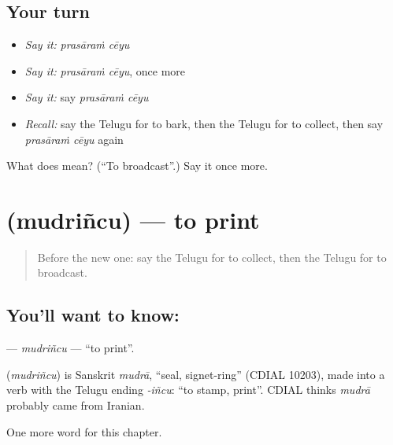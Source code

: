 \subsection*{Your turn}
\begin{itemize}
\raggedright
  \item \emph{Say it:} \emph{prasāraṁ cēyu}
  \item \emph{Say it:} \emph{prasāraṁ cēyu}, once more
  \item \emph{Say it:} say \emph{prasāraṁ cēyu}
  \item \emph{Recall:} say the Telugu for to bark, then the Telugu for to collect, then say \emph{prasāraṁ cēyu} again
\end{itemize}

\begin{tcolorbox}[breakable,colback=teal!4,colframe=teal!35!black,title={Before you move on}]
What does   mean? (\textquotedblleft{}To broadcast\textquotedblright{}.) Say it once more.
\end{tcolorbox}
\section[\texorpdfstring{\te{ముద్రించు} (mudriñcu)}{ముద్రించు (mudriñcu)}]{ (mudriñcu) — to print}

\label{lesson:TE-C245-mudrincu}



\begin{quote}
Before the new one: say the Telugu for to collect, then the Telugu for to broadcast.
\end{quote}

\subsection*{You'll want to know: }
\textbf{} — \emph{mudriñcu} — \textquotedblleft{}to print\textquotedblright{}.

\begin{cousinweb}
\textbf{} (\emph{mudriñcu}) is Sanskrit \emph{mudrā}, \textquotedblleft{}seal, signet-ring\textquotedblright{} (CDIAL 10203), made into a verb with the Telugu ending \emph{-iñcu}: \textquotedblleft{}to stamp, print\textquotedblright{}. CDIAL thinks \emph{mudrā} probably came from Iranian.
\end{cousinweb}

\begin{grammarlens}[title={What you've built}]
One more word for this chapter.
\end{grammarlens}

